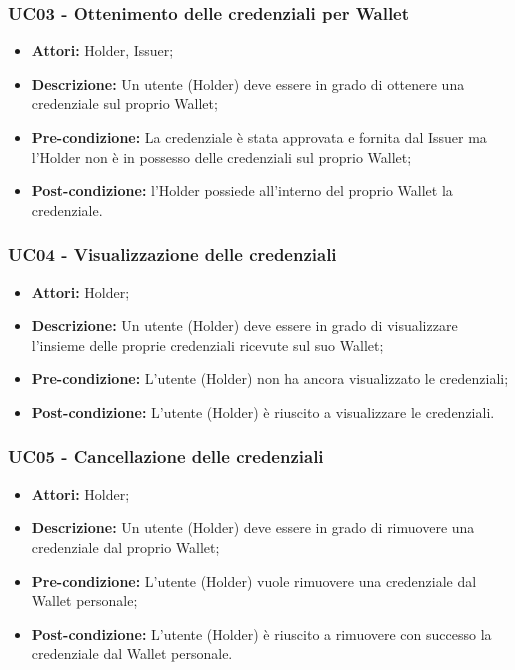 \subsubsection{UC03 - Ottenimento delle credenziali per Wallet}
\begin{itemize}
\item \textbf{Attori:} Holder, Issuer;
\item \textbf{Descrizione:} Un utente (Holder) deve essere in grado di ottenere una credenziale sul proprio Wallet;
\item\textbf{Pre-condizione:} La credenziale è stata approvata e fornita dal Issuer ma l'Holder non è in possesso delle credenziali sul proprio Wallet;
\item \textbf{Post-condizione:} l'Holder possiede all’interno del proprio Wallet la credenziale.
\end{itemize}

\subsubsection{UC04 - Visualizzazione delle credenziali}
\begin{itemize}
\item \textbf{Attori:} Holder;
\item \textbf{Descrizione:} Un utente (Holder) deve essere in grado di visualizzare l'insieme delle proprie credenziali ricevute sul suo Wallet;
\item \textbf{Pre-condizione:} L’utente (Holder) non ha ancora visualizzato le credenziali;
\item \textbf{Post-condizione:} L’utente (Holder) è riuscito a visualizzare le credenziali.
\end{itemize}

\subsubsection{UC05 - Cancellazione delle credenziali}
\begin{itemize}
\item \textbf{Attori:} Holder;
\item \textbf{Descrizione:} Un utente (Holder) deve essere in grado di rimuovere una credenziale dal proprio Wallet;
\item \textbf{Pre-condizione:} L’utente (Holder) vuole rimuovere una credenziale dal Wallet personale;
\item \textbf{Post-condizione:} L’utente (Holder) è riuscito a rimuovere con successo la credenziale dal Wallet personale.
\end{itemize}

